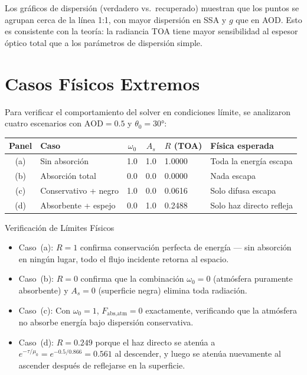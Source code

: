 \documentclass[a4paper,11pt]{article}
\begin{document}
Los gr\'aficos de dispersi\'on (verdadero vs.\ recuperado) muestran que los puntos
se agrupan cerca de la l\'inea 1:1, con mayor dispersi\'on en SSA y $g$ que en AOD.
Esto es consistente con la teor\'ia: la radiancia TOA tiene mayor sensibilidad
al espesor \'optico total que a los par\'ametros de dispersi\'on simple.


\section{Casos F\'isicos Extremos}\label{sec:extreme}

Para verificar el comportamiento del solver en condiciones l\'imite, se
analizaron cuatro escenarios con $\text{AOD} = 0.5$ y $\theta_0 = 30°$:

\begin{center}
\small
\begin{tabular}{@{}clccll@{}}
\toprule
\textbf{Panel} & \textbf{Caso} & $\omega_0$ & $A_s$ &
  \textbf{$R$ (TOA)} & \textbf{F\'isica esperada} \\ \midrule
(a) & Sin absorci\'on  & 1.0 & 1.0 & 1.0000 & Toda la energ\'ia escapa \\
(b) & Absorci\'on total & 0.0 & 0.0 & 0.0000 & Nada escapa \\
(c) & Conservativo + negro & 1.0 & 0.0 & 0.0616 & Solo difusa escapa \\
(d) & Absorbente + espejo & 0.0 & 1.0 & 0.2488 & Solo haz directo refleja \\
\bottomrule
\end{tabular}
\end{center}

\begin{keyresult}{Verificaci\'on de L\'imites F\'isicos}
\begin{itemize}
    \item Caso~(a): $R = 1$ confirma conservaci\'on perfecta de energ\'ia ---
          sin absorci\'on en ning\'un lugar, todo el flujo incidente retorna al espacio.
    \item Caso~(b): $R = 0$ confirma que la combinaci\'on $\omega_0 = 0$ (atm\'osfera
          puramente absorbente) y $A_s = 0$ (superficie negra) elimina toda radiaci\'on.
    \item Caso~(c): Con $\omega_0 = 1$, $F_{\text{abs,atm}} = 0$ exactamente,
          verificando que la atm\'osfera no absorbe energ\'ia bajo dispersi\'on conservativa.
    \item Caso~(d): $R = 0.249$ porque el haz directo se aten\'ua a
          $e^{-\tau/\mu_0} = e^{-0.5/0.866} = 0.561$ al descender, y luego se aten\'ua
          nuevamente al ascender despu\'es de reflejarse en la superficie.
\end{itemize}
\end{keyresult}
\end{document}
